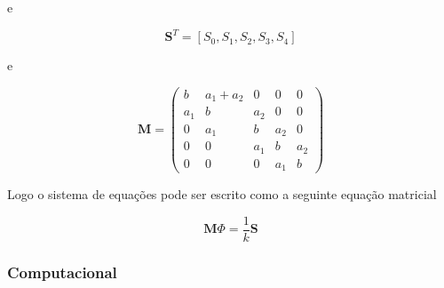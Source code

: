 \documentclass{article}
\begin{document}
                e

                \begin{equation}
                    \textbf{S}^T = [S_0,S_1,S_2,S_3,S_4]
                \end{equation}

                e

                \begin{displaymath}
                    \mathbf{\textbf{M}}=\left(\begin{array}{ccccc}
                    b   & a_1 + a_2 & 0   & 0   & 0   \\
                    a_1 & b   & a_2 & 0   & 0   \\
                    0   & a_1 & b   & a_2 & 0   \\
                    0   & 0   & a_1 & b   & a_2 \\
                    0   & 0   & 0   & a_1 & b
                    \end{array}\right)
                \end{displaymath}

                Logo o sistema de equações pode ser escrito como a seguinte equação matricial

                \begin{equation}
                    \textbf{M}\Phi = \frac{1}{k}\textbf{S} 
                \end{equation}

            \subsubsection{Computacional}
            
\end{document}
